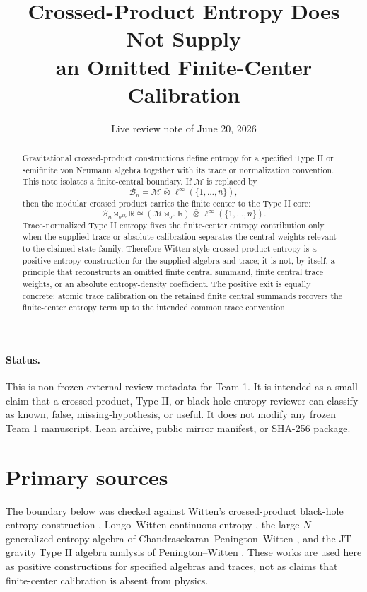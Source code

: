 \documentclass[12pt]{article}
\title{Crossed-Product Entropy Does Not Supply\\
an Omitted Finite-Center Calibration}
\author{}
\date{Live review note of June 20, 2026}
\theoremstyle{remark}
\newcommand{\B}{\mathcal B}
\newcommand{\M}{\mathcal M}
\newcommand{\R}{\mathbb R}
\begin{document}
\maketitle

\begin{abstract}
Gravitational crossed-product constructions define entropy for a specified
Type II or semifinite von Neumann algebra together with its trace or
normalization convention.  This note isolates a finite-central boundary.  If
\(\M\) is replaced by
\[
  \B_n=\M\,\bar\otimes\,\ell^\infty(\{1,\ldots,n\}),
\]
then the modular crossed product carries the finite center to the Type II core:
\[
  \B_n\rtimes_{\sigma^{\Omega_r}}\R
  \cong
  (\M\rtimes_{\sigma^\omega}\R)\,\bar\otimes\,
  \ell^\infty(\{1,\ldots,n\}).
\]
Trace-normalized Type II entropy fixes the finite-center entropy contribution
only when the supplied trace or absolute calibration separates the central
weights relevant to the claimed state family.  Therefore Witten-style
crossed-product entropy is a positive entropy construction for the supplied
algebra and trace; it is not, by itself, a principle that reconstructs an
omitted finite central summand, finite central trace weights, or an absolute
entropy-density coefficient.  The positive exit is equally concrete: atomic
trace calibration on the retained finite central summands recovers the
finite-center entropy term up to the intended common trace convention.
\end{abstract}

\paragraph{Status.}
This is non-frozen external-review metadata for Team 1.  It is intended as a
small claim that a crossed-product, Type II, or black-hole entropy reviewer can
classify as known, false, missing-hypothesis, or useful.  It does not modify
any frozen Team 1 manuscript, Lean archive, public mirror manifest, or SHA-256
package.

\section{Primary sources}

The boundary below was checked against Witten's crossed-product black-hole
entropy construction \cite{WittenCrossed}, Longo--Witten continuous entropy
\cite{LongoWittenEntropy}, the large-\(N\) generalized-entropy algebra of
Chandrasekaran--Penington--Witten \cite{CPWLargeN}, and the JT-gravity Type II
algebra analysis of Penington--Witten \cite{PeningtonWittenJT}.  These works
are used here as positive constructions for specified algebras and traces, not
as claims that finite-center calibration is absent from physics.
\end{document}
